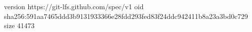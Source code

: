 version https://git-lfs.github.com/spec/v1
oid sha256:591aa7465ddd3b9131933366e28fdd293fed83f24ddc942411b8a23a3bd0c729
size 41473
